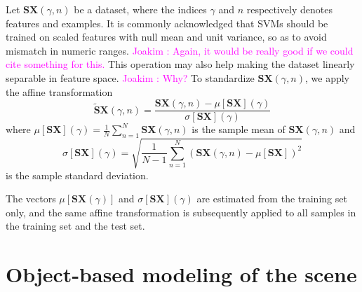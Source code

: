 \documentclass[journal]{IEEEtran}
\newcommand{\ja}[1]{\textcolor{magenta}{Joakim : #1}}
\begin{document}
Let $\mathbf{S}\boldsymbol{X}(\gamma,n)$ be a dataset, where the indices $\gamma$ and $n$ respectively denotes features and examples.
It is commonly acknowledged that SVMs should be trained on scaled features with null mean and unit variance, so as to avoid mismatch in numeric ranges. \ja{Again, it would be really good if we could cite something for this.}
This operation may also help making the dataset linearly separable in feature space. \ja{Why?}
To standardize $\mathbf{S}\boldsymbol{X}(\gamma,n)$, we apply the affine transformation
\begin{equation}
\widetilde{\mathbf{S}}\boldsymbol{X}(\gamma, n) =
\dfrac{ \mathbf{S}\boldsymbol{X}(\gamma, n) -
\mu[ \mathbf{S}\boldsymbol{X}](\gamma)}{\sigma[ \mathbf{S}\boldsymbol{X}](\gamma)}
\end{equation}
where $\mu[ \mathbf{S}\boldsymbol{X}](\gamma) = \frac{1}{N} \sum_{n=1}^{N} \mathbf{S}\boldsymbol{X}(\gamma,n)$ is the sample mean of $\mathbf{S}\boldsymbol{X}(\gamma,n)$ and
\begin{equation}
\sigma[\mathbf{S}\boldsymbol{X}] (\gamma) =
\sqrt{\frac{1}{N-1} \sum_{n=1}^{N}
\left( \mathbf{S}\boldsymbol{X}(\gamma,n) - \mu[\mathbf{S}\boldsymbol{X}] \right)^2}
\end{equation}
is the sample standard deviation.

The vectors $\mu[\mathbf{S}\boldsymbol{X}(\gamma)]$ and $\sigma[\mathbf{S}\boldsymbol{X}](\gamma)$ are estimated from the training set only, and the same affine transformation is subsequently applied to all samples in the training set and the test set.

\section{Object-based modeling of the scene}
\label{sec:object}


\end{document}
